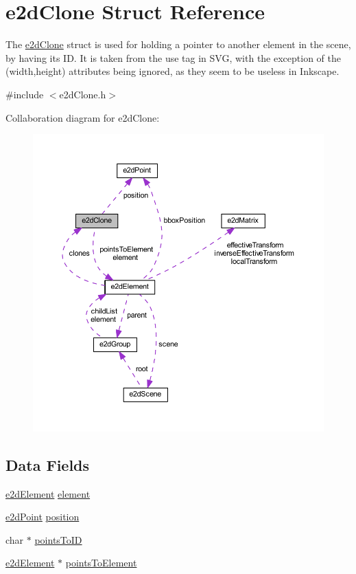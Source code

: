 \hypertarget{structe2dClone}{\section{e2d\-Clone Struct Reference}
\label{structe2dClone}
}


The \hyperlink{structe2dClone}{e2d\-Clone} struct is used for holding a pointer to another element in the scene, by having its I\-D. It is taken from the use tag in S\-V\-G, with the exception of the (width,height) attributes being ignored, as they seem to be useless in Inkscape.  




{\ttfamily \#include $<$e2d\-Clone.\-h$>$}



Collaboration diagram for e2d\-Clone\-:\nopagebreak
\begin{figure}[H]
\begin{center}
\leavevmode
\includegraphics[width=350pt]{structe2dClone__coll__graph}
\end{center}
\end{figure}
\subsection*{Data Fields}
\begin{DoxyCompactItemize}
\item 
\hyperlink{structe2dElement}{e2d\-Element} \hyperlink{structe2dClone_a55bc7a3a0af41fba9e5b91f390c5928c}{element}
\item 
\hyperlink{structe2dPoint}{e2d\-Point} \hyperlink{structe2dClone_afa8983f25fd6aa6aca18feb07d8d2249}{position}
\item 
char $\ast$ \hyperlink{structe2dClone_a8e7bcbfdc0e0c94d13e02502f2c7ba01}{points\-To\-I\-D}
\item 
\hyperlink{structe2dElement}{e2d\-Element} $\ast$ \hyperlink{structe2dClone_a237249b3b105a04b15b87304bba704a2}{points\-To\-Element}
\end{DoxyCompactItemize}


